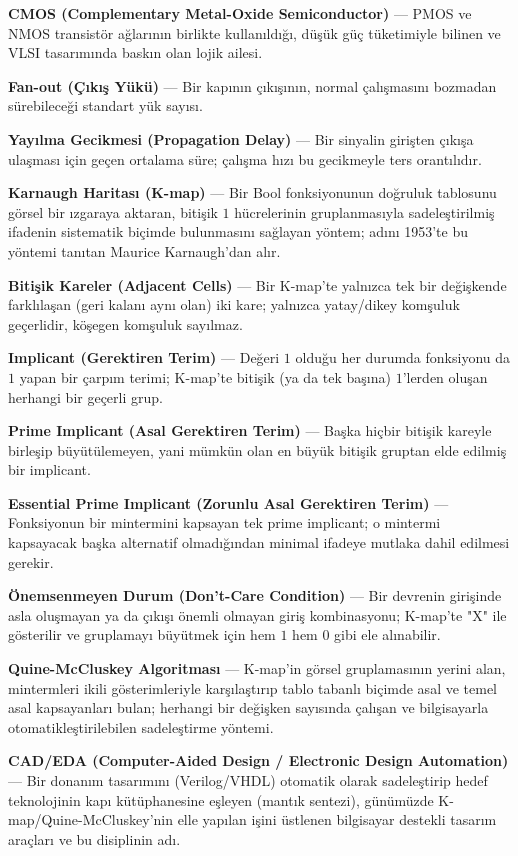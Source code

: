 \textbf{CMOS (Complementary Metal-Oxide Semiconductor)} --- PMOS ve NMOS transistör
ağlarının birlikte kullanıldığı, düşük güç tüketimiyle bilinen ve VLSI tasarımında baskın
olan lojik ailesi.

\textbf{Fan-out (Çıkış Yükü)} --- Bir kapının çıkışının, normal çalışmasını bozmadan
sürebileceği standart yük sayısı.

\textbf{Yayılma Gecikmesi (Propagation Delay)} --- Bir sinyalin girişten çıkışa ulaşması
için geçen ortalama süre; çalışma hızı bu gecikmeyle ters orantılıdır.

\textbf{Karnaugh Haritası (K-map)} --- Bir Bool fonksiyonunun doğruluk tablosunu görsel bir
ızgaraya aktaran, bitişik $1$ hücrelerinin gruplanmasıyla sadeleştirilmiş ifadenin
sistematik biçimde bulunmasını sağlayan yöntem; adını 1953'te bu yöntemi tanıtan Maurice
Karnaugh'dan alır.

\textbf{Bitişik Kareler (Adjacent Cells)} --- Bir K-map'te yalnızca tek bir değişkende
farklılaşan (geri kalanı aynı olan) iki kare; yalnızca yatay/dikey komşuluk geçerlidir,
köşegen komşuluk sayılmaz.

\textbf{Implicant (Gerektiren Terim)} --- Değeri $1$ olduğu her durumda fonksiyonu da $1$
yapan bir çarpım terimi; K-map'te bitişik (ya da tek başına) $1$'lerden oluşan herhangi
bir geçerli grup.

\textbf{Prime Implicant (Asal Gerektiren Terim)} --- Başka hiçbir bitişik kareyle birleşip
büyütülemeyen, yani mümkün olan en büyük bitişik gruptan elde edilmiş bir implicant.

\textbf{Essential Prime Implicant (Zorunlu Asal Gerektiren Terim)} --- Fonksiyonun bir
mintermini kapsayan tek prime implicant; o mintermi kapsayacak başka alternatif
olmadığından minimal ifadeye mutlaka dahil edilmesi gerekir.

\textbf{Önemsenmeyen Durum (Don't-Care Condition)} --- Bir devrenin girişinde asla
oluşmayan ya da çıkışı önemli olmayan giriş kombinasyonu; K-map'te "X" ile gösterilir ve
gruplamayı büyütmek için hem $1$ hem $0$ gibi ele alınabilir.

\textbf{Quine-McCluskey Algoritması} --- K-map'in görsel gruplamasının yerini alan,
mintermleri ikili gösterimleriyle karşılaştırıp tablo tabanlı biçimde asal ve temel asal
kapsayanları bulan; herhangi bir değişken sayısında çalışan ve bilgisayarla
otomatikleştirilebilen sadeleştirme yöntemi.

\textbf{CAD/EDA (Computer-Aided Design / Electronic Design Automation)} --- Bir donanım
tasarımını (Verilog/VHDL) otomatik olarak sadeleştirip hedef teknolojinin kapı
kütüphanesine eşleyen (mantık sentezi), günümüzde K-map/Quine-McCluskey'nin elle yapılan
işini üstlenen bilgisayar destekli tasarım araçları ve bu disiplinin adı.
